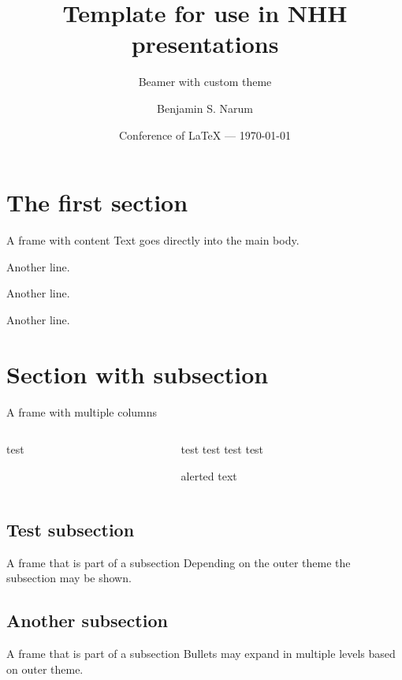 \documentclass[aspectratio=169]{beamer}
\title[NHH Template]{Template for use in NHH presentations}
\subtitle[]{Beamer with custom theme}
\author[Narum]{Benjamin S. Narum}
\institute[NHH]{NHH Norwegian School of Economics}
\date[\year]{Conference of \LaTeX{} ---{} \today}
\begin{document}
\frame[plain]{\titlepage{}}

\section{The first section}

\begin{frame}{A frame with content}
	Text goes directly into the main body.
	
	\vspace{1em}

	Another line.
	
	\vspace{1em}

	Another line.

	\vspace{1em}

	Another line.
\end{frame}

\section{Section with subsection}

\begin{frame}{A frame with multiple columns}

\begin{columns}
\begin{column}{0.49\textwidth}
test
\end{column}
\colseparator{}
\begin{column}{0.49\textwidth}
test
\vspace{1em}
test
\vspace{1em}
test
\vspace{1em}
test
\vspace{1em}

\alert{alerted text}
\end{column}
\end{columns}

\end{frame}

\subsection{Test subsection}
\begin{frame}{A frame that is part of a subsection}
	Depending on the outer theme the subsection may be shown.
\end{frame}

\subsection{Another subsection}
\begin{frame}{A frame that is part of a subsection}
	Bullets may expand in multiple levels based on outer theme.
\end{frame}
\end{document}
